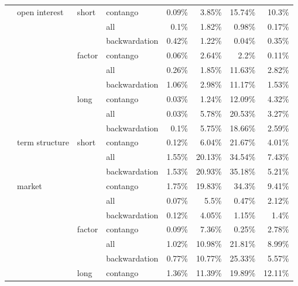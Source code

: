 \documentclass[]{elsarticle} %
\begin{document}
\begin{longtable}[t]{>{}llllrrrr}
 & \multirow[t]{-9}{*}{\raggedright\arraybackslash open interest} & \multirow[t]{-3}{*}{\raggedright\arraybackslash short} & contango & 0.09\% & 3.85\% & 15.74\% & 10.3\%\\
\nopagebreak
 &  &  & all & 0.1\% & 1.82\% & 0.98\% & 0.17\%\\
\nopagebreak
 &  &  & backwardation & 0.42\% & 1.22\% & 0.04\% & 0.35\%\\
\nopagebreak
 &  & \multirow[t]{-3}{*}{\raggedright\arraybackslash factor} & contango & 0.06\% & 2.64\% & 2.2\% & 0.11\%\\
\nopagebreak
 &  &  & all & 0.26\% & 1.85\% & 11.63\% & 2.82\%\\
\nopagebreak
 &  &  & backwardation & 1.06\% & 2.98\% & 11.17\% & 1.53\%\\
\nopagebreak
 &  & \multirow[t]{-3}{*}{\raggedright\arraybackslash long} & contango & 0.03\% & 1.24\% & 12.09\% & 4.32\%\\
\nopagebreak
 &  &  & all & 0.03\% & 5.78\% & 20.53\% & 3.27\%\\
\nopagebreak
 &  &  & backwardation & 0.1\% & 5.75\% & 18.66\% & 2.59\%\\
\nopagebreak
\multirow[t]{-30}{*}{\raggedright\arraybackslash \textbf{market}} & \multirow[t]{-9}{*}{\raggedright\arraybackslash term structure} & \multirow[t]{-3}{*}{\raggedright\arraybackslash short} & contango & 0.12\% & 6.04\% & 21.67\% & 4.01\%\\
\cmidrule{1-8}\pagebreak[0]
 &  &  & all & 1.55\% & 20.13\% & 34.54\% & 7.43\%\\
\nopagebreak
 &  &  & backwardation & 1.53\% & 20.93\% & 35.18\% & 5.21\%\\
\nopagebreak
 & \multirow[t]{-3}{*}{\raggedright\arraybackslash market} &  & contango & 1.75\% & 19.83\% & 34.3\% & 9.41\%\\
\nopagebreak
 &  &  & all & 0.07\% & 5.5\% & 0.47\% & 2.12\%\\
\nopagebreak
 &  &  & backwardation & 0.12\% & 4.05\% & 1.15\% & 1.4\%\\
\nopagebreak
 &  & \multirow[t]{-6}{*}{\raggedright\arraybackslash factor} & contango & 0.09\% & 7.36\% & 0.25\% & 2.78\%\\
\nopagebreak
 &  &  & all & 1.02\% & 10.98\% & 21.81\% & 8.99\%\\
\nopagebreak
 &  &  & backwardation & 0.77\% & 10.77\% & 25.33\% & 5.57\%\\
\nopagebreak
 &  & \multirow[t]{-3}{*}{\raggedright\arraybackslash long} & contango & 1.36\% & 11.39\% & 19.89\% & 12.11\%\\

\end{longtable}
\end{document}
